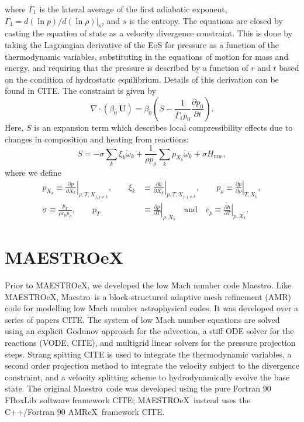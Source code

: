 \documentclass[a4paper]{jpconf}
\newcommand{\maestro}{{\sffamily Maestro}}
\newcommand{\maestroex}{{\sffamily MAESTROeX}}
\newcommand{\amrex}{{\sffamily AMReX}}
\newcommand{\fboxlib}{{\sffamily FBoxLib}}
\newcommand{\Ub}{{\,\bm{U}}}
\newcommand{\pd}[2]{\frac{\partial #1}{\partial #2}}
\begin{document}
where $\bar{\Gamma}_1$ is the lateral average of the first adiabatic exponent, $\Gamma_1 = d(\ln p)/d(\ln \rho)|_s$, and $s$ is the entropy. The equations are closed by casting the equation of state as a velocity divergence constraint. This is done by taking the Lagrangian derivative of the EoS for pressure as a function of the thermodynamic variables, substituting in the equations of motion for mass and energy, and requiring that the pressure is described by a function of $r$ and $t$ based on the condition of hydrostatic equilibrium. Details of this derivation can be found in CITE. The constraint is given by 
\begin{equation}
    \nabla\cdot\left(\beta_0\Ub\right) = \beta_0 \left(S - \frac{1}{\bar{\Gamma}_1 p_0}\pd{p_0}{t} \right).
\end{equation}
Here, $S$ is an expansion term which describes local compressibility effects due to changes in composition and heating from reactions:
\begin{equation}
    S = -\sigma \sum_k \xi_k\dot{\omega}_k + \frac{1}{\rho p_\rho}\sum_k p_{X_k}\dot{\omega}_k + \sigma H_{\mathrm{nuc}},
\end{equation}
where we define 
\begin{align*}
    p_{X_k} \equiv \left.\pd{p}{X_k}\right|_{\rho,T,X_{j,j\neq k}},\qquad
     \xi_k&\equiv \left.\pd{h}{X_k}\right|_{p, T,X_{j,j\neq k}},\qquad
     p_\rho\equiv \left.\pd{p}{\rho}\right|_{T, X_k},\\
     \sigma \equiv \frac{p_T}{\rho c_p p_\rho}, \qquad
     p_T&\equiv \left.\pd{p}{T}\right|_{\rho, X_k} \quad\mathrm{and}\quad 
     c_p\equiv \left.\pd{h}{T}\right|_{p, X_k}.
\end{align*}


\section{MAESTROeX} \label{sec:maestroex}



Prior to \maestroex, we developed the low Mach number code \maestro. Like \maestroex, \maestro~is a block-structured adaptive mesh refinement (AMR) code for modelling low Mach number astrophysical codes. It was developed over a series of papers CITE. The system of low Mach number equations are solved using an explicit Godunov approach for the advection, a stiff ODE solver for the reactions (VODE, CITE), and multigrid linear solvers for the pressure projection steps. Strang spitting CITE is used to integrate the thermodynamic variables, a second order projection method to integrate the velocity subject to the divergence constraint, and a velocity splitting scheme to hydrodynamically evolve the base state. The original \maestro~code was developed using the pure Fortran 90 \fboxlib~software framework CITE; \maestroex~instead uses the C++/Fortran 90 \amrex~framework CITE. 
\end{document}
